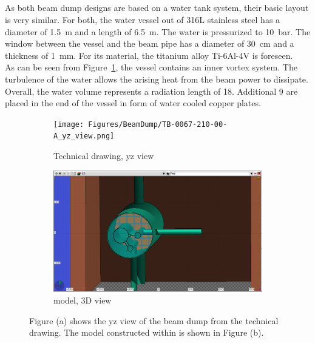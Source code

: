 \subsection{\designone}
\label{BeamDumps:design:design1}
As both beam dump designs are based on a water tank system, their basic layout is very similar.
For both, the water vessel out of 316L stainless steel has a diameter of \SI{1.5}{\meter} and a length of \SI{6.5}{\meter}.
The water is pressurized to \SI{10}{\bar}.
The window between the vessel and the beam pipe has a diameter of \SI{30}{\centi\meter} and a thickness of \SI{1}{\milli\meter}.
For its material, the titanium alloy Ti-6Al-4V is foreseen.
\\As can be seen from Figure~\ref{fig:BeamDumps:design1}, the vessel contains an inner vortex system.
The turbulence of the water allows the arising heat from the beam power to dissipate.
\\Overall, the water volume represents a radiation length of \SI{18}{\xzero}.
Additional \SI{9}{\xzero} are placed in the end of the vessel in form of water cooled copper plates.

\begin{figure}[h]
 \centering
  \begin{subfigure}[b]{0.49\textwidth}
   \centering
    \texttt{[image: Figures/BeamDump/TB-0067-210-00-A\_yz\_view.png]}
   \caption{Technical drawing, yz view}
   \end{subfigure}
   \hfill
    \begin{subfigure}[b]{0.49\textwidth}
   \centering
    \includegraphics[width=\textwidth]{Figures/BeamDump/Design1_geometry_3Dinside.png}
   \caption{\fluka model, 3D view}
   \end{subfigure}
   \caption[ILC main beam dump design 1]{Figure (a) shows the yz view of the beam dump \designone from the technical drawing.
   The \fluka model constructed within \flair is shown in Figure (b).}
   \label{fig:BeamDumps:design1}
 \end{figure}


